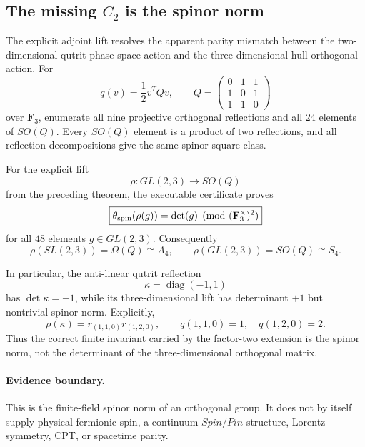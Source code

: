 \subsection*{The missing \(C_2\) is the spinor norm}

The explicit adjoint lift resolves the apparent parity mismatch between the
two-dimensional qutrit phase-space action and the three-dimensional hull
orthogonal action. For
\[
 q(v)=\frac12v^TQv,\qquad
 Q=\begin{pmatrix}0&1&1\\1&0&1\\1&1&0\end{pmatrix}
\]
over \(\mathbf F_3\), enumerate all nine projective orthogonal reflections and
all \(24\) elements of \(SO(Q)\). Every \(SO(Q)\) element is a product of two
reflections, and all reflection decompositions give the same spinor
square-class.

For the explicit lift
\[
 \rho:GL(2,3)\longrightarrow SO(Q)
\]
from the preceding theorem, the executable certificate proves
\[
 \boxed{
 \theta_{\rm spin}(\rho(g))
 =
 \det(g)\pmod{(\mathbf F_3^\times)^2}
 }
\]
for all \(48\) elements \(g\in GL(2,3)\). Consequently
\[
 \rho(SL(2,3))=\Omega(Q)\cong A_4,\qquad
 \rho(GL(2,3))=SO(Q)\cong S_4.
\]

In particular, the anti-linear qutrit reflection
\[
 \kappa=\operatorname{diag}(-1,1)
\]
has \(\det\kappa=-1\), while its three-dimensional lift has determinant
\(+1\) but nontrivial spinor norm. Explicitly,
\[
 \rho(\kappa)=r_{(1,1,0)}r_{(1,2,0)},\qquad
 q(1,1,0)=1,\quad q(1,2,0)=2.
\]
Thus the correct finite invariant carried by the factor-two extension is the
spinor norm, not the determinant of the three-dimensional orthogonal matrix.

\paragraph{Evidence boundary.}
This is the finite-field spinor norm of an orthogonal group. It does not by
itself supply physical fermionic spin, a continuum \(Spin/Pin\) structure,
Lorentz symmetry, CPT, or spacetime parity.
